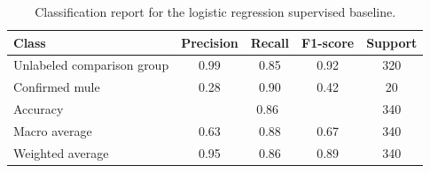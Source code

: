 \begin{table}[H]
\centering
\begin{tabular}{lcccc}
\hline
Class & Precision & Recall & F1-score & Support \\
\hline
Unlabeled comparison group & 0.99 & 0.85 & 0.92 & 320 \\
Confirmed mule & 0.28 & 0.90 & 0.42 & 20 \\
\hline
Accuracy & \multicolumn{3}{c}{0.86} & 340 \\
Macro average & 0.63 & 0.88 & 0.67 & 340 \\
Weighted average & 0.95 & 0.86 & 0.89 & 340 \\
\hline
\end{tabular}
\caption{Classification report for the logistic regression supervised baseline.}
\label{tab:logistic_classification_report}
\end{table}

